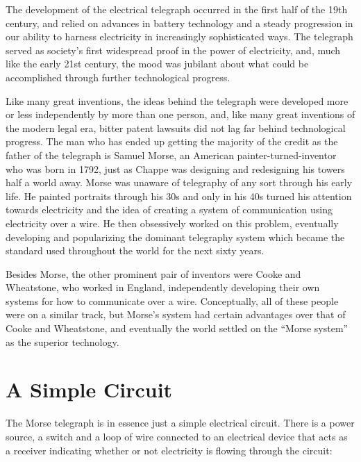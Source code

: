 \documentclass[UTF8]{book}
\begin{document}
\begin{CJK}{UTF8}{gbsn}
The development of the electrical telegraph occurred in the first half of the 19th century, and relied on advances in battery technology and a steady progression in our ability to harness electricity in increasingly sophisticated ways. The telegraph served as society's first widespread proof in the power of electricity, and, much like the early 21st century, the mood was jubilant about what could be accomplished through further technological progress.

Like many great inventions, the ideas behind the telegraph were developed more or less independently by more than one person, and, like many great inventions of the modern legal era, bitter patent lawsuits did not lag far behind technological progress. The man who has ended up getting the majority of the credit as the father of the telegraph is Samuel Morse, an American painter-turned-inventor who was born in 1792, just as Chappe was designing and redesigning his towers half a world away. Morse was unaware of telegraphy of any sort through his early life. He painted portraits through his 30s and only in his 40s turned his attention towards electricity and the idea of creating a system of communication using electricity over a wire. He then obsessively worked on this problem, eventually developing and popularizing the dominant telegraphy system which became the standard used throughout the world for the next sixty years.

Besides Morse, the other prominent pair of inventors were Cooke and Wheatstone, who worked in England, independently developing their own systems for how to communicate over a wire. Conceptually, all of these people were on a similar track, but Morse's system had certain advantages over that of Cooke and Wheatstone, and eventually the world settled on the ``Morse system'' as the superior technology.

\section{A Simple Circuit}

The Morse telegraph is in essence just a simple electrical circuit. There is a power source, a switch and a loop of wire connected to an electrical device that acts as a receiver indicating whether or not electricity is flowing through the circuit:


\end{CJK}
\end{document}
